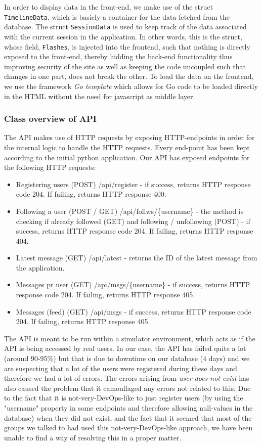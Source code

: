 In order to display data in the front-end, we make use of the struct \texttt{TimelineData}, which is basicly a container for the data fetched from the database. The struct \texttt{SessionData} is used to keep track of the data associated with the current session in the application. In other words, this is the struct, whose field, \texttt{Flashes}, is injected into the frontend, such that nothing is directly exposed to the front-end, thereby hidding the back-end functionality thus improving security of the site as well as keeping the code uncoupled such that changes in one part, does not break the other. To load the data on the frontend, we use the framework \textit{Go template} which allows for Go code to be loaded directly in the HTML without the need for javascript as middle layer.

\subsubsection*{Class overview of API}
The API makes use of HTTP requests by exposing HTTP-endpoints in order for the internal logic to handle the HTTP requests. Every end-point has been kept according to the initial python application.  
Our API has exposed endpoints for the following HTTP requests:
\begin{itemize}
    \item Registering users (POST) /api/register - if success, returns HTTP response code 204. If failing, returns HTTP response 400.
    \item Following a user (POST / GET) /api/follws/\{username\} - the method is checking if already followed (GET) and following / unfollowing (POST)  - if success, returns HTTP response code 204. If failing, returns HTTP response 404.
    \item Latest message (GET) /api/latest  - returns the ID of the latest message from the application.
    \item Messages pr user (GET) /api/msgs/\{username\} - if success, returns HTTP response code 204. If failing, returns HTTP response 405.
    \item Messages (feed) (GET) /api/msgs - if success, returns HTTP response code 204. If failing, returns HTTP response 405.
\end{itemize}

The API is meant to be run within a simulator environment, which acts as if the API is being accessed by real users. In our case, the API has failed quite a lot (around 90-95\%) but that is due to downtime on our database (4 days) and we are suspecting that a lot of the users were registered during these days and therefore we had a lot of errors. The errors arising from \textit{user does not exist} has also caused the problem that it camouflaged any errors not related to this. Due to the fact that it is not-very-DevOps-like to just register users (by using the "username" property in some endpoints and therefore allowing null-values in the database) when they did not exist, and the fact that it seemed that most of the groups we talked to had used this not-very-DevOps-like approach, we have been unable to find a way of resolving this in a proper matter.
    
